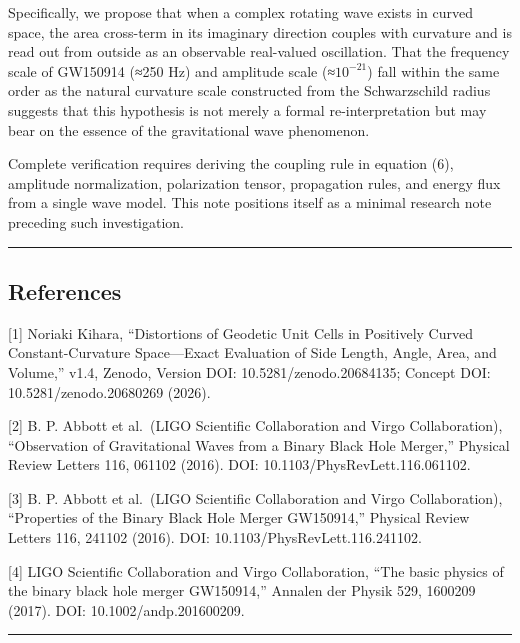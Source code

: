 \documentclass[
  a4paper,
]{article}
\begin{document}
Specifically, we propose that when a complex rotating wave exists in
curved space, the area cross-term in its imaginary direction couples
with curvature and is read out from outside as an observable real-valued
oscillation. That the frequency scale of GW150914 (≈250 Hz) and
amplitude scale (≈\(10^{-21}\)) fall within the same order as the
natural curvature scale constructed from the Schwarzschild radius
suggests that this hypothesis is not merely a formal re-interpretation
but may bear on the essence of the gravitational wave phenomenon.

Complete verification requires deriving the coupling rule in equation
(6), amplitude normalization, polarization tensor, propagation rules,
and energy flux from a single wave model. This note positions itself as
a minimal research note preceding such investigation.

\begin{center}\rule{0.5\linewidth}{0.5pt}\end{center}

\subsection{References}\label{references}

{[}1{]} Noriaki Kihara, ``Distortions of Geodetic Unit Cells in
Positively Curved Constant-Curvature Space---Exact Evaluation of Side
Length, Angle, Area, and Volume,'' v1.4, Zenodo, Version DOI:
10.5281/zenodo.20684135; Concept DOI: 10.5281/zenodo.20680269 (2026).

{[}2{]} B. P. Abbott et al.~(LIGO Scientific Collaboration and Virgo
Collaboration), ``Observation of Gravitational Waves from a Binary Black
Hole Merger,'' Physical Review Letters 116, 061102 (2016). DOI:
10.1103/PhysRevLett.116.061102.

{[}3{]} B. P. Abbott et al.~(LIGO Scientific Collaboration and Virgo
Collaboration), ``Properties of the Binary Black Hole Merger GW150914,''
Physical Review Letters 116, 241102 (2016). DOI:
10.1103/PhysRevLett.116.241102.

{[}4{]} LIGO Scientific Collaboration and Virgo Collaboration, ``The
basic physics of the binary black hole merger GW150914,'' Annalen der
Physik 529, 1600209 (2017). DOI: 10.1002/andp.201600209.

\begin{center}\rule{0.5\linewidth}{0.5pt}\end{center}
\end{document}
